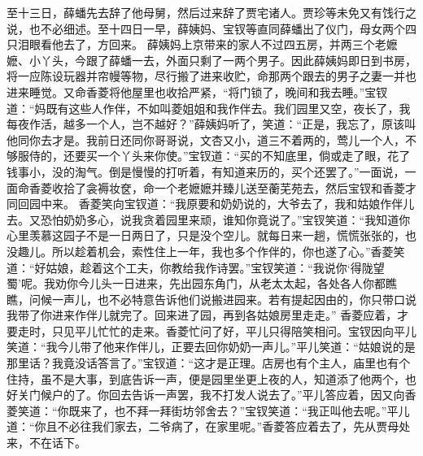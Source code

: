 \documentclass[12pt,oneside]{book}
\begin{document}
至十三日，薛蟠先去辞了他母舅，然后过来辞了贾宅诸人。贾珍等未免又有饯行之说，也不必细述。至十四日一早，薛姨妈、宝钗等直同薛蟠出了仪门，母女两个四只泪眼看他去了，方回来。
薛姨妈上京带来的家人不过四五房，并两三个老嬷嬷、小丫头，今跟了薛蟠一去，外面只剩了一两个男子。因此薛姨妈即日到书房，将一应陈设玩器并帘幔等物，尽行搬了进来收贮，命那两个跟去的男子之妻一并也进来睡觉。又命香菱将他屋里也收拾严紧，“将门锁了，晚间和我去睡。”宝钗道：“妈既有这些人作伴，不如叫菱姐姐和我作伴去。我们园里又空，夜长了，我每夜作活，越多一个人，岂不越好？”薛姨妈听了，笑道：“正是，我忘了，原该叫他同你去才是。我前日还同你哥哥说，文杏又小，道三不着两的，莺儿一个人，不够服侍的，还要买一个丫头来你使。”宝钗道：“买的不知底里，倘或走了眼，花了钱事小，没的淘气。倒是慢慢的打听着，有知道来历的，买个还罢了。”一面说，一面命香菱收拾了衾褥妆奁，命一个老嬷嬷并臻儿送至蘅芜苑去，然后宝钗和香菱才同回园中来。
香菱笑向宝钗道：“我原要和奶奶说的，大爷去了，我和姑娘作伴儿去。又恐怕奶奶多心，说我贪着园里来顽，谁知你竟说了。”宝钗笑道：“我知道你心里羡慕这园子不是一日两日了，只是没个空儿。就每日来一趟，慌慌张张的，也没趣儿。所以趁着机会，索性住上一年，我也多个作伴的，你也遂了心。”香菱笑道：“好姑娘，趁着这个工夫，你教给我作诗罢。”宝钗笑道：“我说你‘得陇望蜀’呢。我劝你今儿头一日进来，先出园东角门，从老太太起，各处各人你都瞧瞧，问候一声儿，也不必特意告诉他们说搬进园来。若有提起因由的，你只带口说我带了你进来作伴儿就完了。回来进了园，再到各姑娘房里走走。”
香菱应着，才要走时，只见平儿忙忙的走来。香菱忙问了好，平儿只得陪笑相问。宝钗因向平儿笑道：“我今儿带了他来作伴儿，正要去回你奶奶一声儿。”平儿笑道：“姑娘说的是那里话？我竟没话答言了。”宝钗道：“这才是正理。店房也有个主人，庙里也有个住持，虽不是大事，到底告诉一声，便是园里坐更上夜的人，知道添了他两个，也好关门候户的了。你回去告诉一声罢，我不打发人说去了。”平儿答应着，因又向香菱笑道：“你既来了，也不拜一拜街坊邻舍去？”宝钗笑道：“我正叫他去呢。”平儿道：“你且不必往我们家去，二爷病了，在家里呢。”香菱答应着去了，先从贾母处来，不在话下。
\end{document}
